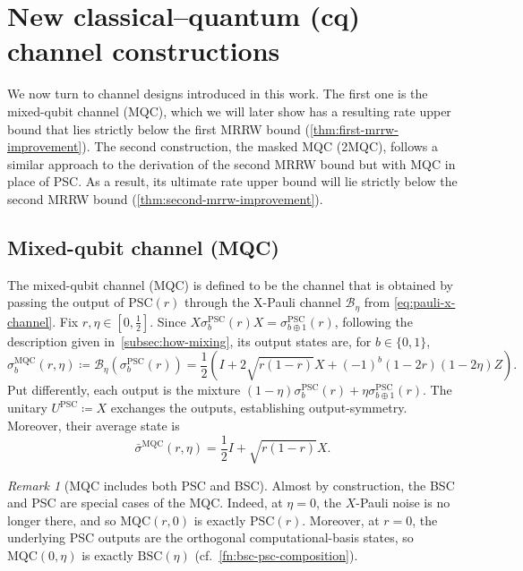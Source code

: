 \documentclass[11pt]{article}
\theoremstyle{remark}
\newtheorem{remark}{Remark}[section]
\newcommand{\bits}{\{0,1\}}
\newcommand{\BSC}{\mathrm{BSC}}
\newcommand{\PSC}{\mathrm{PSC}}
\newcommand{\MQC}{\mathrm{MQC}}
\begin{document}
\section{New classical--quantum (cq) channel constructions}
\label{sec:new-cq-channels}

We now turn to channel designs introduced in this work. The first one is the mixed-qubit channel (MQC), which we will later show has a resulting rate upper bound that lies strictly below the first MRRW bound (\cref{thm:first-mrrw-improvement}). The second construction, the masked MQC (2MQC), follows a similar approach to the derivation of the second MRRW bound but with MQC in place of PSC. As a result, its ultimate rate upper bound will lie strictly below the second MRRW bound (\cref{thm:second-mrrw-improvement}).

\subsection{Mixed-qubit channel (MQC)}
\label{subsec:mqc}

The mixed-qubit channel (MQC) is defined to be the channel that is obtained by passing the output of $\PSC(r)$ through the X-Pauli channel $\mathcal{B}_\eta$ from \eqref{eq:pauli-x-channel}. Fix $r,\eta \in [0,\frac{1}{2}]$. Since $X\sigma_b^{\PSC}(r)X = \sigma_{b \oplus 1}^{\PSC}(r)$, following the description given in~\cref{subsec:how-mixing}, its output states are, for $b \in \bits$,
\begin{equation}
\label{eq:mqc-pauli-form}
\sigma_b^{\MQC}(r,\eta)
\coloneqq \mathcal{B}_\eta\left(\sigma_b^{\PSC}(r)\right)
=\frac{1}{2}\left(I+2\sqrt{r(1-r)}X+(-1)^b(1-2r)(1-2\eta)Z\right).
\end{equation}
Put differently, each output is the mixture $(1-\eta)\sigma_b^{\PSC}(r)+\eta\sigma_{b \oplus 1}^{\PSC}(r)$. The unitary $U^{\PSC} \coloneqq X$ exchanges the outputs, establishing output-symmetry. Moreover, their average state is
\begin{equation}
\label{eq:mqc-average-state}
\bar{\sigma}^{\MQC}(r,\eta)
=\frac{1}{2}I+\sqrt{r(1-r)}X.
\end{equation}

\begin{remark}[MQC includes both PSC and BSC]
\label{rem:mqc-endpoints}
Almost by construction, the BSC and PSC are special cases of the MQC. Indeed, at $\eta = 0$, the $X$-Pauli noise is no longer there, and so $\MQC(r,0)$ is exactly $\PSC(r)$. Moreover, at $r = 0$, the underlying PSC outputs are the orthogonal computational-basis states, so $\MQC(0,\eta)$ is exactly $\BSC(\eta)$ (cf.~\cref{fn:bsc-psc-composition}).
\end{remark}
\end{document}
